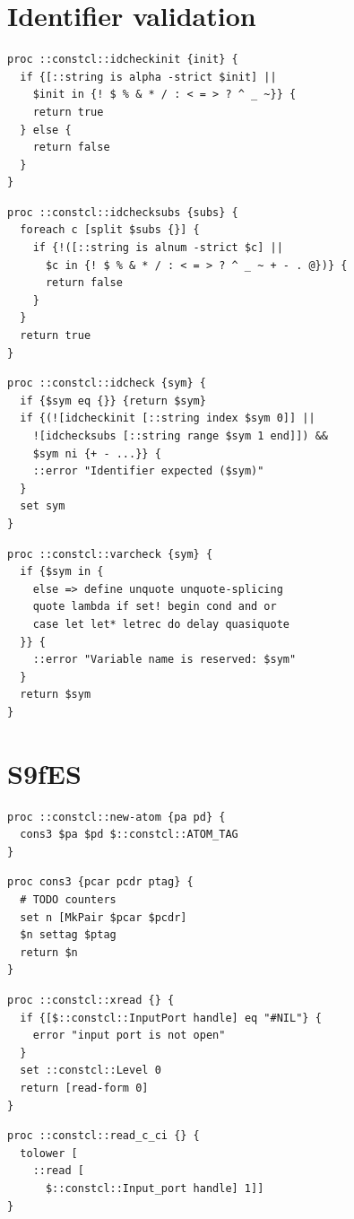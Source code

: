 \documentclass[twoside,9pt]{report}
\begin{document}
\chapter{Identifier validation}
\label{identifier-validation}
\begin{lstlisting}
proc ::constcl::idcheckinit {init} {
  if {[::string is alpha -strict $init] ||
    $init in {! $ % & * / : < = > ? ^ _ ~}} {
    return true
  } else {
    return false
  }
}
\end{lstlisting}
\begin{lstlisting}
proc ::constcl::idchecksubs {subs} {
  foreach c [split $subs {}] {
    if {!([::string is alnum -strict $c] ||
      $c in {! $ % & * / : < = > ? ^ _ ~ + - . @})} {
      return false
    }
  }
  return true
}
\end{lstlisting}
\begin{lstlisting}
proc ::constcl::idcheck {sym} {
  if {$sym eq {}} {return $sym}
  if {(![idcheckinit [::string index $sym 0]] ||
    ![idchecksubs [::string range $sym 1 end]]) &&
    $sym ni {+ - ...}} {
    ::error "Identifier expected ($sym)"
  }
  set sym
}
\end{lstlisting}
\begin{lstlisting}
proc ::constcl::varcheck {sym} {
  if {$sym in {
    else => define unquote unquote-splicing
    quote lambda if set! begin cond and or
    case let let* letrec do delay quasiquote
  }} {
    ::error "Variable name is reserved: $sym"
  }
  return $sym
}
\end{lstlisting}
\chapter{S9fES}
\label{s9fes}
\begin{lstlisting}
proc ::constcl::new-atom {pa pd} {
  cons3 $pa $pd $::constcl::ATOM_TAG
}
\end{lstlisting}
\begin{lstlisting}
proc cons3 {pcar pcdr ptag} {
  # TODO counters
  set n [MkPair $pcar $pcdr]
  $n settag $ptag
  return $n
}
\end{lstlisting}
\begin{lstlisting}
proc ::constcl::xread {} {
  if {[$::constcl::InputPort handle] eq "#NIL"} {
    error "input port is not open"
  }
  set ::constcl::Level 0
  return [read-form 0]
}
\end{lstlisting}
\begin{lstlisting}
proc ::constcl::read_c_ci {} {
  tolower [
    ::read [
      $::constcl::Input_port handle] 1]]
}
\end{lstlisting}
\end{document}
